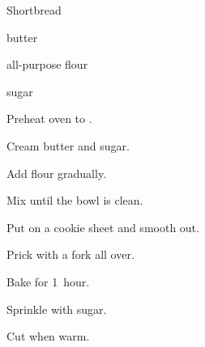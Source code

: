 \begin{recipe}{Shortbread}{}{}

\begin{ingredients}
\item {} butter
\item {} all-purpose flour
\item {} sugar
\end{ingredients}

\begin{directions}
\item Preheat oven to .
\item Cream butter and sugar.
\item Add flour gradually.
\item Mix until the bowl is clean.
\item Put on a cookie sheet and smooth out.
\item Prick with a fork all over.
\item Bake for 1~hour.
\item Sprinkle with sugar.
\item Cut when warm.
\end{directions}
\end{recipe}
